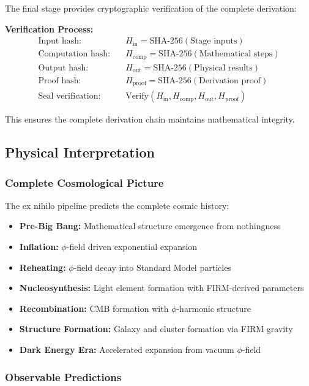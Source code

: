 The final stage provides cryptographic verification of the complete derivation:

\textbf{Verification Process:}
\begin{align}
\text{Input hash:} &\quad H_{\text{in}} = \text{SHA-256}(\text{Stage inputs})\\
\text{Computation hash:} &\quad H_{\text{comp}} = \text{SHA-256}(\text{Mathematical steps})\\
\text{Output hash:} &\quad H_{\text{out}} = \text{SHA-256}(\text{Physical results})\\
\text{Proof hash:} &\quad H_{\text{proof}} = \text{SHA-256}(\text{Derivation proof})\\
\text{Seal verification:} &\quad \text{Verify}(H_{\text{in}}, H_{\text{comp}}, H_{\text{out}}, H_{\text{proof}})
\end{align}

This ensures the complete derivation chain maintains mathematical integrity.

\subsection{Physical Interpretation}

\subsubsection{Complete Cosmological Picture}

The ex nihilo pipeline predicts the complete cosmic history:

\begin{itemize}
\item \textbf{Pre-Big Bang:} Mathematical structure emergence from nothingness
\item \textbf{Inflation:} $\phi$-field driven exponential expansion
\item \textbf{Reheating:} $\phi$-field decay into Standard Model particles
\item \textbf{Nucleosynthesis:} Light element formation with FIRM-derived parameters
\item \textbf{Recombination:} CMB formation with $\phi$-harmonic structure
\item \textbf{Structure Formation:} Galaxy and cluster formation via FIRM gravity
\item \textbf{Dark Energy Era:} Accelerated expansion from vacuum $\phi$-field
\end{itemize}

\subsubsection{Observable Predictions}

